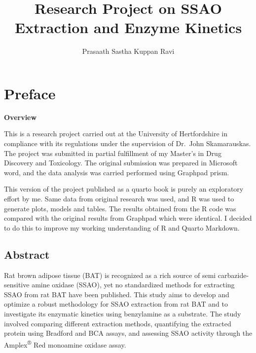 \documentclass[
  letterpaper,
  DIV=11,
  numbers=noendperiod]{scrreprt}
\title{Research Project on SSAO Extraction and Enzyme Kinetics}
\author{Prasaath Sastha Kuppan Ravi}
\date{}
\renewcommand*\contentsname{Table of contents}
\newcommand\contentsname{Table of contents}
\begin{document}
\maketitle

\renewcommand*\contentsname{Table of contents}
{
\hypersetup{linkcolor=}
\setcounter{tocdepth}{2}
\tableofcontents
}


\chapter*{Preface}\label{preface}


\textbf{Overview}

This is a research project carried out at the University of
Hertfordshire in compliance with its regulations under the supervision
of Dr.~John Skamarauskas. The project was submitted in partial
fulfillment of my Master's in Drug Discovery and Toxicology. The
original submission was prepared in Microsoft word, and the data
analysis was carried performed using Graphpad prism.

This version of the project published as a quarto book is purely an
exploratory effort by me. Same data from original research was used, and
R was used to generate plots, models and tables. The results obtained
from the R code was compared with the original results from Graphpad
which were identical. I decided to do this to improve my working
understanding of R and Quarto Markdown.

\section*{\texorpdfstring{\textbf{Abstract}}{Abstract}}\label{abstract}


Rat brown adipose tissue (BAT) is recognized as a rich source of semi
carbazide-sensitive amine oxidase (SSAO), yet no standardized methods
for extracting SSAO from rat BAT have been published. This study aims to
develop and optimize a robust methodology for SSAO extraction from rat
BAT and to investigate its enzymatic kinetics using benzylamine as a
substrate. The study involved comparing different extraction methods,
quantifying the extracted protein using Bradford and BCA assays, and
assessing SSAO activity through the Amplex\textsuperscript{®} Red
monoamine oxidase assay.
\end{document}
